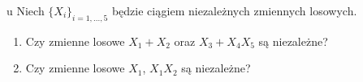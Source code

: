 \documentclass{article}
\begin{document}

\begin{problem}[14]{u}
Niech $\{X_i\}_{i=1,...,5}$ będzie ciągiem niezależnych zmiennych losowych.
\begin{enumerate}[label=(\alph*)]
    \item Czy zmienne losowe $X_1+X_2$ oraz $X_3+X_4X_5$ są niezależne?
    \item Czy zmienne losowe $X_1$, $X_1X_2$ są niezależne?
\end{enumerate}
\end{problem}
\end{document}
